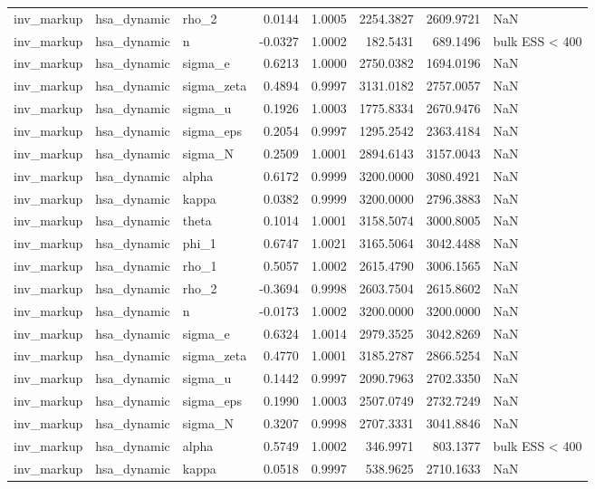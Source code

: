 \begin{tabular}{lllrrrrl}
inv\_markup & hsa\_dynamic & rho\_2 & 0.0144 & 1.0005 & 2254.3827 & 2609.9721 & NaN \\
inv\_markup & hsa\_dynamic & n & -0.0327 & 1.0002 & 182.5431 & 689.1496 & bulk ESS < 400 \\
inv\_markup & hsa\_dynamic & sigma\_e & 0.6213 & 1.0000 & 2750.0382 & 1694.0196 & NaN \\
inv\_markup & hsa\_dynamic & sigma\_zeta & 0.4894 & 0.9997 & 3131.0182 & 2757.0057 & NaN \\
inv\_markup & hsa\_dynamic & sigma\_u & 0.1926 & 1.0003 & 1775.8334 & 2670.9476 & NaN \\
inv\_markup & hsa\_dynamic & sigma\_eps & 0.2054 & 0.9997 & 1295.2542 & 2363.4184 & NaN \\
inv\_markup & hsa\_dynamic & sigma\_N & 0.2509 & 1.0001 & 2894.6143 & 3157.0043 & NaN \\
inv\_markup & hsa\_dynamic & alpha & 0.6172 & 0.9999 & 3200.0000 & 3080.4921 & NaN \\
inv\_markup & hsa\_dynamic & kappa & 0.0382 & 0.9999 & 3200.0000 & 2796.3883 & NaN \\
inv\_markup & hsa\_dynamic & theta & 0.1014 & 1.0001 & 3158.5074 & 3000.8005 & NaN \\
inv\_markup & hsa\_dynamic & phi\_1 & 0.6747 & 1.0021 & 3165.5064 & 3042.4488 & NaN \\
inv\_markup & hsa\_dynamic & rho\_1 & 0.5057 & 1.0002 & 2615.4790 & 3006.1565 & NaN \\
inv\_markup & hsa\_dynamic & rho\_2 & -0.3694 & 0.9998 & 2603.7504 & 2615.8602 & NaN \\
inv\_markup & hsa\_dynamic & n & -0.0173 & 1.0002 & 3200.0000 & 3200.0000 & NaN \\
inv\_markup & hsa\_dynamic & sigma\_e & 0.6324 & 1.0014 & 2979.3525 & 3042.8269 & NaN \\
inv\_markup & hsa\_dynamic & sigma\_zeta & 0.4770 & 1.0001 & 3185.2787 & 2866.5254 & NaN \\
inv\_markup & hsa\_dynamic & sigma\_u & 0.1442 & 0.9997 & 2090.7963 & 2702.3350 & NaN \\
inv\_markup & hsa\_dynamic & sigma\_eps & 0.1990 & 1.0003 & 2507.0749 & 2732.7249 & NaN \\
inv\_markup & hsa\_dynamic & sigma\_N & 0.3207 & 0.9998 & 2707.3331 & 3041.8846 & NaN \\
inv\_markup & hsa\_dynamic & alpha & 0.5749 & 1.0002 & 346.9971 & 803.1377 & bulk ESS < 400 \\
inv\_markup & hsa\_dynamic & kappa & 0.0518 & 0.9997 & 538.9625 & 2710.1633 & NaN \\

\end{tabular}
